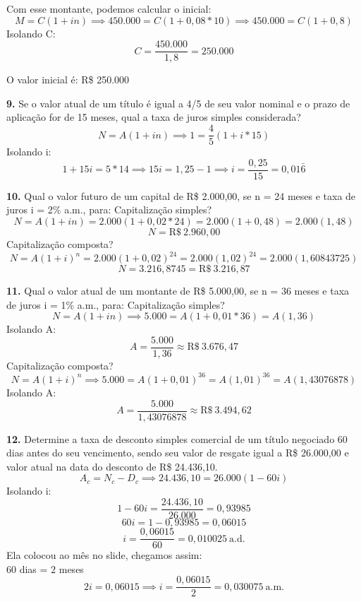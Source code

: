 \documentclass[12pt,a4paper]{article}
\begin{document}
  Com esse montante, podemos calcular o inicial:
  \[
    M = C ( 1 + in ) \implies 450.000 = C ( 1 + 0,08*10) \implies 450.000 = C ( 1 + 0,8 )
  \]
  Isolando C:
  \[
    C = \frac{450.000}{1,8} = 250.000
  \]

  O valor inicial é: R\$ 250.000  

  \textbf{9.} Se o valor atual de um título é igual a 4/5 de seu valor nominal e o prazo de
  aplicação for de 15 meses, qual a taxa de juros simples considerada?
  \[
    N = A ( 1 + in ) \implies 1 = \frac{4}{5} (1 + i*15)
  \]
  Isolando i:
  \[
    1 + 15i = {5*1}{4} \implies 15i = 1,25 - 1 \implies i = \frac{0,25}{15} = 0,01\bar{6}
  \]

  \textbf{10.} Qual o valor futuro de um capital de R\$ 2.000,00, se n = 24 meses e taxa de juros i = 2\% a.m., para:
  \hspace*{.5cm} Capitalização simples?
  \[
    N = A ( 1 + in ) = 2.000 (1 + 0,02*24) = 2.000 (1 + 0,48) = 2.000(1,48)
  \]
  \[
    N = \text{R\$}\ 2.960,00
  \]
  \hspace*{.5cm} Capitalização composta?
  \[
    N = A ( 1  + i)^n = 2.000 ( 1 + 0,02)^{24} = 2.000 (1,02)^{24} = 2.000(1,60843725)
  \]
  \[
    N = 3.216,8745 = \text{R\$}\ 3.216,87
  \]
  
  \textbf{11.} Qual o valor atual de um montante de R\$ 5.000,00, se n = 36 meses e taxa de
  juros i = 1\% a.m., para:
  \hspace*{.5cm} Capitalização simples?
  \[
    N = A ( 1 + in ) \implies 5.000  = A (1 + 0,01*36) = A (1,36)
  \]
  Isolando A:
  \[
    A = \frac{5.000}{1,36} \approx \text{R\$}\ 3.676,47
  \]
  \hspace*{.5cm} Capitalização composta?
  \[
    N = A ( 1  + i)^n \implies 5.000 = A ( 1 + 0,01)^{36} = A (1,01)^{36} = A(1,43076878)
  \]
  Isolando A:
  \[
    A = \frac{5.000}{1,43076878} \approx \text{R\$}\ 3.494,62
  \]
  \newpage

  \textbf{12.} Determine a taxa de desconto simples comercial de um título negociado 60 dias
  antes do seu vencimento, sendo seu valor de resgate igual a R\$ 26.000,00 e valor atual na
  data do desconto de R\$ 24.436,10.
  \[
    A_c = N_c - D_c \implies 24.436,10 = 26.000 ( 1 - 60i )
  \]
  Isolando i:
  \[
    1 - 60i = \frac{24.436,10}{26.000} = 0,93985
  \]
  \[
    60i = 1 - 0,93985 = 0,06015
  \]
  \[
    i = \frac{0,06015}{60} = 0,010025\ \text{a.d.}
  \]
  Ela colocou ao mês no slide, chegamos assim: \\
  $60$ dias = $2$ meses
  \[
   2i = 0,06015 \implies i = \frac{0,06015}{2} = 0,030075\ \text{a.m.}
  \]
\end{document}
